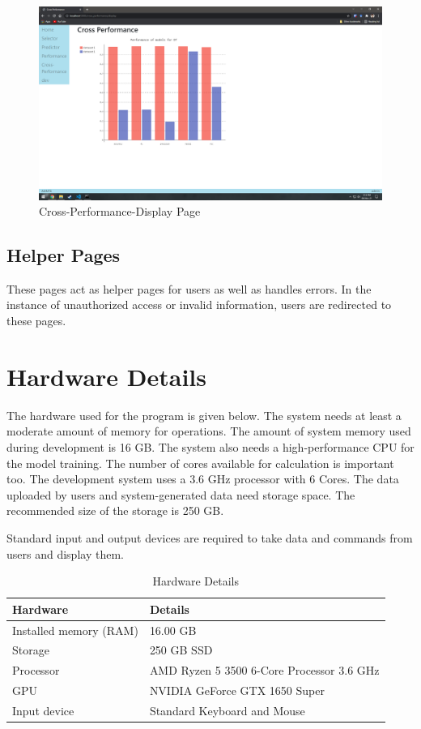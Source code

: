 \begin{figure}[H]
    \centering
    \includegraphics[width=0.7\columnwidth]{media/website/pages/05_cross_performance_display.png}
    \caption{Cross-Performance-Display Page}
    \label{fig:web_cross_performance_display_page}
\end{figure}

\subsection{Helper Pages} \label{subsec:helper_page}
These pages act as helper pages for users as well as handles errors. In the instance of
unauthorized access or invalid information, users are redirected to these pages.

\section{Hardware Details} \label{sec:hardware_details}
The hardware used for the program is given below. The system needs at least a moderate amount
of memory for operations. The amount of system memory used during development is 16 GB. The
system also needs a high-performance CPU for the model training. The number of cores available
for calculation is important too. The development system uses a 3.6 GHz processor with 6 Cores.
The data uploaded by users and system-generated data need storage space. The recommended size
of the storage is 250 GB.

Standard input and output devices are required to take data and commands from users and display
them.

\begin{table}[H]
    \centering
    \caption{Hardware Details} \label{tab:hardware_details}
    \begin{tabular}{|L{10em}|L{25em}|}
        \hline
        \textbf{Hardware} & \textbf{Details}
        \rule[-2ex]{0pt}{4ex}\\\hline
        Installed memory (RAM) & 16.00 GB
        \rule[-2ex]{0pt}{4ex}\\\hline
        Storage & 250 GB SSD
        \rule[-2ex]{0pt}{4ex}\\\hline
        Processor & AMD Ryzen 5 3500 6-Core Processor 3.6 GHz
        \rule[-2ex]{0pt}{4ex}\\\hline
        GPU & NVIDIA GeForce GTX 1650 Super
        \rule[-2ex]{0pt}{4ex}\\\hline
        Input device & Standard Keyboard and Mouse
        \rule[-2ex]{0pt}{4ex}\\\hline
    \end{tabular}
\end{table}

